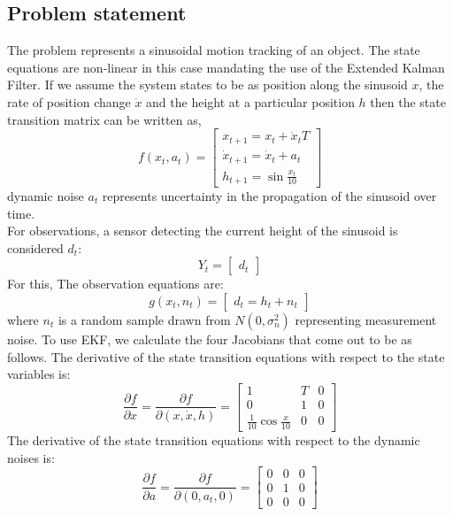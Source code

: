 \documentclass{article}
\begin{document}
\subsection{Problem statement}
	The problem represents a sinusoidal motion tracking of an object. The state equations are non-linear in this case mandating the use of the Extended Kalman Filter. If we assume the system states to be as position along the sinusoid $x$, the rate of position change $\dot{x}$ and the height at a particular position $h$ then the state transition matrix can be written as,
\begin{equation}
f(x_t,a_t) = \begin{bmatrix}
x_{t+1} = x_t + \dot{x}_t T \\
\dot{x}_{t+1} = \dot{x}_t + a_t \\
h_{t+1} = \sin \frac{x_t}{10}
\end{bmatrix}
\end{equation}
dynamic noise $a_t$ represents uncertainty in the propagation of the sinusoid over time. \hfill  \\ \linebreak
For observations, a sensor detecting the current height of the sinusoid is considered $d_t$:
\begin{equation}
Y_t = \begin{bmatrix}
d_t
\end{bmatrix}
\end{equation} For this, The observation equations are:
\begin{equation}
g(x_t,n_t) = \begin{bmatrix}
d_t = h_t + n_t
\end{bmatrix}
\end{equation}
where $n_t$ is a random sample drawn from $N(0,\sigma_n^2)$ representing measurement noise. To use EKF, we calculate the four Jacobians that come out to be as follows.
The derivative of the state transition equations with respect to the state variables is:
\begin{equation}
\frac{\partial f}{\partial x} =
\frac{\partial f}{\partial (x,\dot{x},h)} =
\begin{bmatrix}
1 & T & 0  \\
0 & 1 & 0  \\
\frac{1}{10} \cos \frac{x}{10} & 0 & 0 
\end{bmatrix}
\end{equation}
The derivative of the state transition equations with respect to the
dynamic noises is:
\begin{equation}
\frac{\partial f}{\partial a} =
\frac{\partial f}{\partial (0,a_t,0)} =
\begin{bmatrix}
0 & 0 & 0  \\
0 & 1 & 0  \\
0 & 0 & 0 
\end{bmatrix}
\end{equation}
\end{document}
